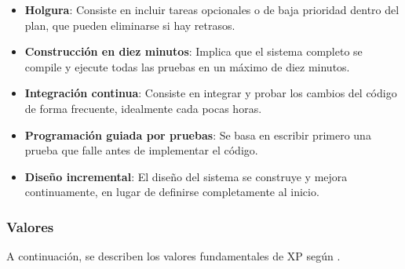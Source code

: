 \begin{itemize}
      \item \textbf{Holgura}: Consiste en incluir tareas opcionales o de baja
            prioridad dentro del plan, que pueden eliminarse si hay retrasos.

      \item \textbf{Construcción en diez minutos}: Implica que el sistema
            completo se compile y ejecute todas las pruebas en un máximo de diez
            minutos.


      \item \textbf{Integración continua}: Consiste en integrar y probar los
            cambios del código de forma frecuente, idealmente cada pocas horas.

      \item \textbf{Programación guiada por pruebas}: Se basa en escribir
            primero una prueba que falle antes de implementar el código.

      \item \textbf{Diseño incremental}: El diseño del sistema se construye y
            mejora continuamente, en lugar de definirse completamente al inicio.




\end{itemize}

\subsubsection{Valores} A continuación, se describen los  valores  fundamentales
de XP según \parencite{beck2004xp}.

